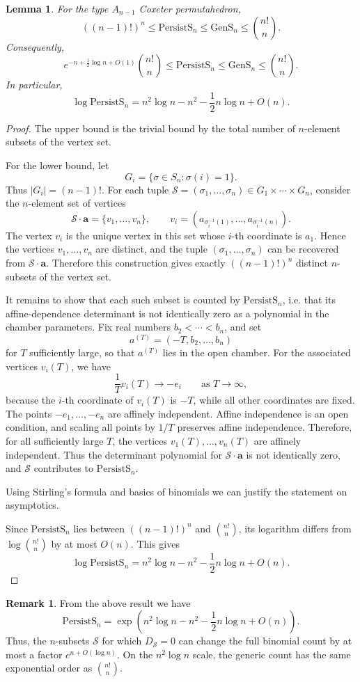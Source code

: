 \documentclass{amsart}
\newtheorem{lem}[thm]{Lemma}
\theoremstyle{definition}
\newtheorem{rmk}[thm]{Remark}
\def\ba{\mathbf{a}}
\def\cS{\mathcal{S}}
\def\gsimp{\mathrm{GenS}}
\def\psimp{\mathrm{PersistS}}
\begin{document}
\begin{lem}\label{lem:asymptotics}
For the type \(A_{n-1}\) Coxeter permutahedron,
\[
((n-1)!)^n \le \psimp_n \le \gsimp_n \le \binom{n!}{n}.
\]
Consequently,
\[
e^{-n+\frac12\log n+O(1)}\binom{n!}{n}
\le \psimp_n
\le
\gsimp_n \le
\binom{n!}{n}.
\]
In particular,
\[
\log \psimp_n
=
 n^2\log n-n^2-\frac12 n\log n+O(n).
\]
\end{lem}

\begin{proof}
The upper bound is the trivial bound by the total number of \(n\)-element
subsets of the vertex set.

For the lower bound, let
\[
G_i=\{\sigma\in S_n:\sigma(i)=1\}.
\]
Thus \(|G_i|=(n-1)!\). For each tuple
\(\cS=(\sigma_1,\dots,\sigma_n)\in G_1\times\cdots\times G_n\), consider the
\(n\)-element set of vertices
\[
\cS\cdot\ba
=
\{v_1,\dots,v_n\},
\qquad
v_i=(a_{\sigma_i^{-1}(1)},\dots,a_{\sigma_i^{-1}(n)}).
\]
The vertex \(v_i\) is the unique vertex in this set whose \(i\)-th coordinate
is \(a_1\). Hence the vertices \(v_1,\dots,v_n\) are distinct, and the tuple
\((\sigma_1,\dots,\sigma_n)\) can be recovered from \(\cS\cdot\ba\). Therefore
this construction gives exactly \(((n-1)!)^n\) distinct \(n\)-subsets of the
vertex set.

It remains to show that each such subset is counted by \(\psimp_n\), i.e.
that its affine-dependence determinant is not identically zero as a polynomial
in the chamber parameters. Fix real numbers
\(b_2<\cdots<b_n\), and set
\[
a^{(T)}=(-T,b_2,\dots,b_n)
\]
for \(T\) sufficiently large, so that \(a^{(T)}\) lies in the open chamber.
For the associated vertices \(v_i(T)\), we have
\[
\frac{1}{T}v_i(T)\longrightarrow -e_i
\qquad\text{as }T\to\infty,
\]
because the \(i\)-th coordinate of \(v_i(T)\) is \(-T\), while all other
coordinates are fixed. The points
\(-e_1,\dots,-e_n\) are affinely independent. Affine independence is an open
condition, and scaling all points by \(1/T\) preserves affine independence.
Therefore, for all sufficiently large \(T\), the vertices
\(v_1(T),\dots,v_n(T)\) are affinely independent. Thus the determinant
polynomial for \(\cS\cdot\ba\) is not identically zero, and
\(\cS\) contributes to \(\psimp_n\). 

Using Stirling's formula and basics of binomials we can justify the statement on asymptotics.

Since \(\psimp_n\) lies between \(((n-1)!)^n\) and \(\binom{n!}{n}\), its
logarithm differs from \(\log\binom{n!}{n}\) by at most \(O(n)\). This gives
\[
\log \psimp_n
=
 n^2\log n-n^2-\frac12n\log n+O(n).
\]
\end{proof}
 \begin{rmk}
     From the above result we have
\[
\psimp_n
=
\exp\left(n^2\log n-n^2-\frac12n\log n+O(n)\right).
\]
Thus, the \(n\)-subsets \(\cS\) for which
\(D_\cS=0\) can change the full binomial count by at most a
factor \(e^{n+O(\log n)}\). On the \(n^2\log n\) scale, the generic count has
the same exponential order as \(\binom{n!}{n}\).
 \end{rmk}
\end{document}
